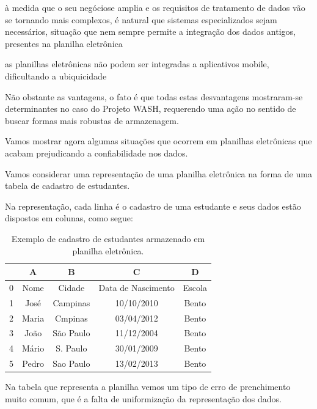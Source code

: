 \documentclass[
12pt,		%
openright,	%
twoside,  %
a4paper,			%
chapter=TITLE,		%
english,			%
french,				%
spanish,			%
brazil				%
]{USPSC-classe/USPSC}
\begin{document}
\begin{alineas}
\item \`a medida que o seu \textquotedbl neg\'ocio\textquotedbl  se amplia e os requisitos de tratamento de dados v\~ao se tornando mais complexos, \'e natural que sistemas especializados sejam necess\'arios, situa\c{c}\~ao que nem sempre permite a integra\c{c}\~ao dos dados antigos, presentes na planilha eletr\^onica
\item as planilhas eletr\^onicas n\~ao podem ser integradas a aplicativos mobile, dificultando a ubiquicidade
\end{alineas}

N\~ao obstante as vantagens, o fato \'e que todas estas desvantagens mostraram-se determinantes no caso do Projeto WASH, requerendo uma a\c{c}\~ao no sentido de buscar formas mais robustas de armazenagem.


Vamos mostrar agora algumas situa\c{c}\~oes que ocorrem em planilhas eletr\^onicas que acabam prejudicando a confiabilidade nos dados.


Vamos considerar uma representa\c{c}\~ao de uma planilha eletr\^onica na forma de uma tabela de cadastro de estudantes.


Na representa\c{c}\~ao, cada linha \'e o cadastro de uma estudante e seus dados est\~ao dispostos em colunas, como segue:






\begin{table}[htb]
\tiny
\caption{\label{ddd7a335bbc10f88eaaf4abda266d151f0ba0e6f}Exemplo de cadastro de estudantes armazenado em planilha eletr\^onica.}

\centering
\begin{tabular}{|c|c|c|c|c|}
\hline
  &  A  &  B  &  C  &  D  \\
\hline
0 & Nome  &  Cidade  &  Data de Nascimento  &  Escola \\
1 & Jos\'e  &  Campinas  &  10/10/2010  &  Bento \\
2 & Maria  &  Cmpinas  &  03/04/2012  &  Bento \\
3 & Jo\~ao  &  S\~ao Paulo  &  11/12/2004  &  Bento \\
4 & M\'ario  &  S. Paulo  &  30/01/2009  &  Bento \\
5 & Pedro  &  Sao Paulo  &  13/02/2013  &  Bento \\
\hline
\end{tabular}
\end{table}


Na tabela que representa a planilha vemos um tipo de erro de prenchimento muito comum, que \'e a falta de uniformiza\c{c}\~ao da representa\c{c}\~ao dos dados.
\end{document}
